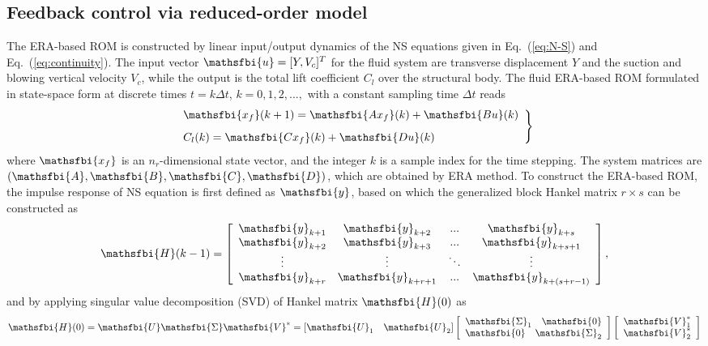 \documentclass[standard]{jfm}
\begin{document}
\subsection{Feedback control via reduced-order model}
The ERA-based ROM is constructed by linear input/output dynamics of the NS equations given in Eq.~(\ref{eq:N-S}) and Eq.~(\ref{eq:continuity}). 
The input vector  $\mathsfbi{u}=[Y,V_c]^T$ for the fluid system are transverse displacement
$Y$ and the suction and blowing vertical velocity $V_c$, while the output  
is the total lift coefficient $C_l$ over the structural body.
The fluid ERA-based ROM formulated in state-space form at discrete times $t=k\Delta t$, 
$k=0,1,2,...,$ with a constant sampling time $\Delta t$ reads 
\begin{equation}
\left. \begin{array}{ll}
\displaystyle \mathsfbi{x_f}(k+1)=\mathsfbi{Ax_f}(k)+\mathsfbi{Bu}(k)  \\[8pt]
\displaystyle C_l(k)=\mathsfbi{Cx_f}(k)+\mathsfbi{Du}(k)
\end{array}\right\}
 \label{eq:fluid}
\end{equation}  
where $\mathsfbi{x_f}$ is an $n_r$-dimensional state vector, and the integer $k$ is a sample index for the time stepping.
%
The system matrices are $\left(\mathsfbi{A},\mathsfbi{B},\mathsfbi{C},\mathsfbi{D}\right)$, 
which are obtained by ERA method. To construct the ERA-based ROM, 
the impulse response of NS equation is first defined as $\mathsfbi{y}$, based on which
the generalized block Hankel matrix $r \times s$ can be constructed as
\begin{equation}
\mathsfbi{H}(k-1) = 
\left[ {\begin{array}{*{20}c}
    \mathsfbi{y}_{k+1}&     \mathsfbi{y}_{k+2}& ...& \mathsfbi{y}_{k+s}        \\    
    \mathsfbi{y}_{k+2}& \mathsfbi{y}_{k+3}& ...& \mathsfbi{y}_{k+s+1}    \\
    \vdots& \vdots& \ddots& \vdots        \\
    \mathsfbi{y}_{k+r}& \mathsfbi{y}_{k+r+1}& ...&\mathsfbi{y}_{k+(s+r-1)}
 \end{array} } \right],
\label{eq:Hankel}
\end{equation}  
and by applying singular value decomposition (SVD) of Hankel matrix $\mathsfbi{H}(0)$ as
\begin{equation}
\mathsfbi{H}(0) = \mathsfbi{U}\mathsfbi{\Sigma}\mathsfbi{V}^*=
\left[\mathsfbi{U}_1 \quad \mathsfbi{U}_2\right]
\left[{\begin{array}{*{20}c}
   \mathsfbi{\Sigma}_1 \quad \mathsfbi{0} \\
   \mathsfbi{0} \quad \mathsfbi{\Sigma}_2
 \end{array} }
\right]
\left[{\begin{array}{*{20}c}
  \mathsfbi{V}_1^* \\
  \mathsfbi{V}_2^*
 \end{array} }
\right]
\end{equation}
\end{document}
